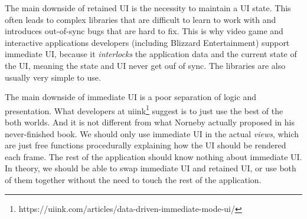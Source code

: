 The main downside of retained UI is the necessity to maintain a UI state.
This often leads to complex libraries that are difficult to learn to work with and introduces out-of-sync bugs that are hard to fix.
This is why video game and interactive applications developers (including Blizzard Entertainment) support immediate UI, because it \emph{interlocks} the application data and the current state of the UI, meaning the state and UI never get ouf of sync.
The libraries are also usually very simple to use.

The main downside of immediate UI is a poor separation of logic and presentation.
What developers at uiink\footnote{https://uiink.com/articles/data-driven-immediate-mode-ui/} suggest is to just use the best of the both worlds.
And it is not different from what Norneby actually proposed in his never-finished book.
We should only use immediate UI in the actual \emph{views}, which are just free functions procedurally explaining how the UI should be rendered each frame.
The rest of the application should know nothing about immediate UI.
In theory, we should be able to swap immediate UI and retained UI, or use both of them together without the need to touch the rest of the application.